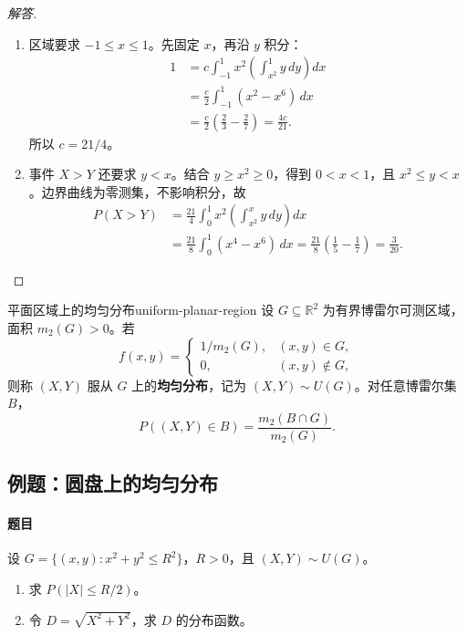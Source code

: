 \begin{proof}[解答]
\begin{enumerate}
\item 区域要求 $-1\leq x\leq1$。先固定 $x$，再沿 $y$ 积分：
\begin{align*}
1&=c\int_{-1}^1x^2\left(\int_{x^2}^1y\,dy\right)dx\\
&=\frac c2\int_{-1}^1(x^2-x^6)\,dx\\
&=\frac c2\left(\frac23-\frac27\right)=\frac{4c}{21}.
\end{align*}
所以 $c=21/4$。

\item 事件 $X>Y$ 还要求 $y<x$。结合 $y\geq x^2\geq0$，得到 $0<x<1$，且 $x^2\leq y<x$。边界曲线为零测集，不影响积分，故
\begin{align*}
P(X>Y)
&=\frac{21}4\int_0^1x^2\left(\int_{x^2}^{x}y\,dy\right)dx\\
&=\frac{21}8\int_0^1(x^4-x^6)\,dx
=\frac{21}8\left(\frac15-\frac17\right)=\frac3{20}.
\end{align*}
\end{enumerate}
\end{proof}

\begin{mydefinition}{平面区域上的均匀分布}{uniform-planar-region}
设 $G\subseteq\mathbb R^2$ 为有界博雷尔可测区域，面积 $m_2(G)>0$。若
\[
f(x,y)=
\begin{cases}
1/m_2(G),&(x,y)\in G,\\
0,&(x,y)\notin G,
\end{cases}
\]
则称 $(X,Y)$ 服从 $G$ 上的\textbf{均匀分布}，记为 $(X,Y)\sim U(G)$。对任意博雷尔集 $B$，
\[
P((X,Y)\in B)=\frac{m_2(B\cap G)}{m_2(G)}.
\]
\end{mydefinition}

\subsection{例题：圆盘上的均匀分布}\label{note:c3:e4}
\paragraph{题目}
设 $G=\{(x,y):x^2+y^2\leq R^2\}$，$R>0$，且 $(X,Y)\sim U(G)$。
\begin{enumerate}
\item 求 $P(|X|\leq R/2)$。

\item 令 $D=\sqrt{X^2+Y^2}$，求 $D$ 的分布函数。
\end{enumerate}

